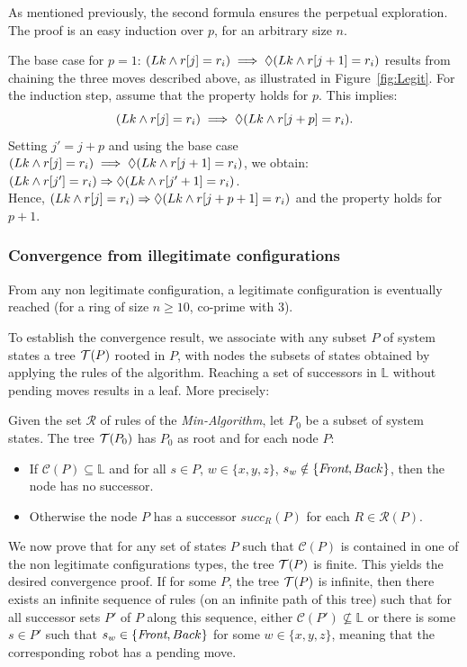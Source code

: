 As mentioned previously, the second formula ensures the perpetual
exploration.  The proof is an easy induction over $p$, for an
arbitrary size $n$.

The base case for $p=1$:  $(Lk \wedge r[j]=r_i) \implies \Diamond (Lk \wedge r[j+1]=r_i)$ 
results from chaining the three moves described above, 
as illustrated in Figure~\ref{fig:Legit}. For
the induction step, assume that the property holds for $p$.  This
implies: $$(Lk \wedge r[j]=r_i) \implies \Diamond (Lk \wedge r[j+p]=r_i).$$
Setting $j'= j+p$ and
using the base case $(Lk \wedge r[j]=r_i) \implies \Diamond (Lk \wedge r[j+1]=r_i)$, 
we obtain: $(Lk \wedge r[j']=r_i) \Rightarrow \Diamond
(Lk \wedge r[j'+1]=r_i)$.\\Hence,  $(Lk \wedge r[j]=r_i) \Rightarrow \Diamond (Lk
\wedge r[j+p+1] = r_i)$ 
and the property holds for $p+1$.


\subsubsection{Convergence from illegitimate configurations}

\begin{theorem}\label{th:conv}
  From any non legitimate configuration, a legitimate configuration is
  eventually reached (for a ring of size $n \geq 10$, co-prime with
  $3$).
\end{theorem}

To establish the convergence result, we associate with any subset $P$
of system states a tree $\mathcal{T}(P)$ rooted in $P$, with nodes the subsets
of states obtained by applying the rules of the algorithm.  Reaching a
set of successors in $\mathbb{L}$ without pending moves results in a
leaf.  More precisely:
\begin{definition}
\label{def:conv}
Given the set $\mathcal{R}$ of rules of the \emph{Min-Algorithm}, 
let $P_0$ be a subset of system states. The tree $\mathcal{T}(P_0)$ has
$P_0$ as root and for each node $P$:
\begin{itemize}
\item If $\mathcal{C}(P) \subseteq \mathbb{L}$ and for all $s \in P$, 
  $w \in \{x, y, z\}$, $s_w \notin \{\textit{Front}, Back \}$, then the node has
  no successor.
\item Otherwise the node $P$ has a successor $succ_{R}(P)$ for each $R
  \in \mathcal{R}(P)$.
\end{itemize}
\end{definition}

We now prove that for any set of states $P$ such that $\mathcal{C}(P)$
is contained in one of the non legitimate configurations types, the
tree $\mathcal{T}(P)$ is finite. This yields the desired convergence proof. If
for some $P$, the tree $\mathcal{T}(P)$ is infinite, then there exists an
infinite sequence of rules (on an infinite path of this tree) such
that for all successor sets $P'$ of $P$ along this sequence, either
$\mathcal{C}(P') \nsubseteq \mathbb{L}$ or there is some $s \in P'$
such that $s_w \in \{\textit{Front}, Back\}$ for some $w \in \{x, y, z\}$, 
meaning that the corresponding robot has a pending move.


